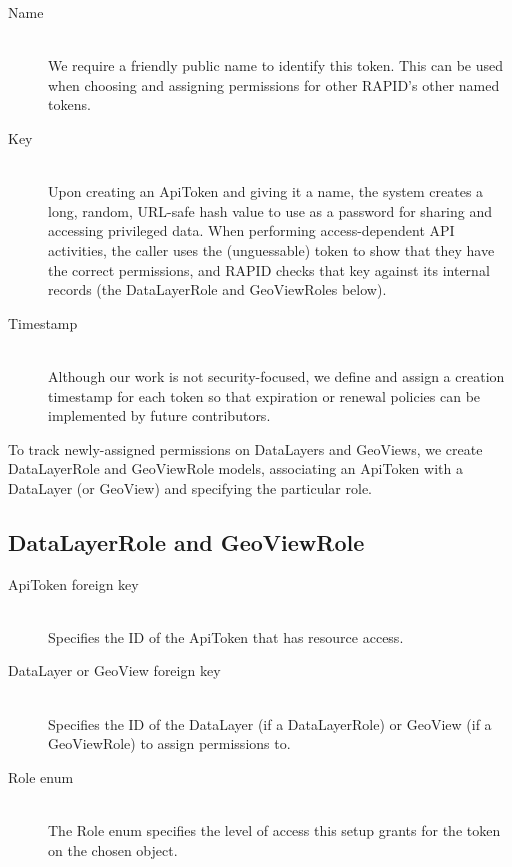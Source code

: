 \begin{description}
\item[Name] \hfill \\
We require a friendly public name to identify this token. This can be used when choosing and assigning permissions for other RAPID's other named tokens.

\item[Key] \hfill \\
Upon creating an ApiToken and giving it a name, the system creates a long, random, URL-safe hash value to use as a password for sharing and accessing privileged data. When performing access-dependent API activities, the caller uses the (unguessable) token to show that they have the correct permissions, and RAPID checks that key against its internal records (the DataLayerRole and GeoViewRoles below).

\item[Timestamp] \hfill \\
Although our work is not security-focused, we define and assign a creation timestamp for each token so that expiration or renewal policies can be implemented by future contributors.

\end{description}
To track newly-assigned permissions on DataLayers and GeoViews, we create DataLayerRole and GeoViewRole models, associating an ApiToken with a DataLayer (or GeoView) and specifying the particular role.

\subsection{DataLayerRole and GeoViewRole}
\begin{description}
\item[ApiToken foreign key] \hfill \\
Specifies the ID of the ApiToken that has resource access.

\item[DataLayer or GeoView foreign key] \hfill \\
Specifies the ID of the DataLayer (if a DataLayerRole) or GeoView (if a GeoViewRole) to assign permissions to.

\item[Role enum] \hfill \\
The Role enum specifies the level of access this setup grants for the token on the chosen object.
\end{description}


